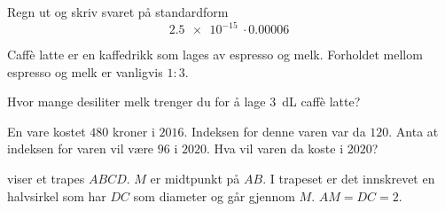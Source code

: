\Oppgave[1] 

Regn ut og skriv svaret på standardform
%
\begin{equation*}
  \SI{2.5e-15}{}
  \cdot
  \SI{0.00006}{}
\end{equation*}


\Oppgave[2] 

Caffè latte er en kaffedrikk som lages av espresso og melk.
Forholdet mellom espresso og melk er vanligvis $1\colon3$. \medskip

Hvor mange desiliter melk trenger du for å lage \SI{3}{\deci\liter} caffè latte?


\Oppgave[2] %

En vare kostet $480$ kroner i $2016$. Indeksen for denne varen var da $120$.
Anta at indeksen for varen vil være $96$ i $2020$.
Hva vil varen da koste i $2020$?

\Oppgave[4]

 viser et trapes $ABCD$. $M$ er midtpunkt på $AB$. I
trapeset er det innskrevet en halvsirkel som har $DC$ som diameter og går
gjennom $M$. $AM = DC = 2$.

\begin{figure}[H]
  \caption{}
  \label{fig:Del-1-Oppgave-5-1}
\end{figure}

